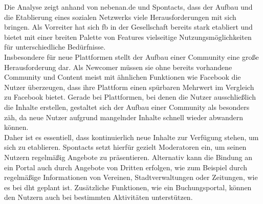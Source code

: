 Die Analyse zeigt anhand von nebenan.de und Spontacts, dass der Aufbau und die Etablierung eines sozialen Netzwerks viele Herausforderungen mit sich bringen. Als Vorreiter hat sich \acrshort{fb} in der Gesellschaft bereits stark etabliert und bietet mit einer breiten Palette von Features vielseitige Nutzungsmöglichkeiten für unterschiedliche Bedürfnisse. \\
Insbesondere für neue Plattformen stellt der Aufbau einer Community eine große Herausforderung dar. Als Newcomer müssen sie ohne bereits vorhandene Community und Content meist mit ähnlichen Funktionen wie Facebook die Nutzer überzeugen, dass ihre Plattform einen spürbaren Mehrwert im Vergleich zu Facebook bietet.
Gerade bei Plattformen, bei denen die Nutzer ausschließlich die Inhalte erstellen, gestaltet sich der Aufbau einer Community als besonders zäh, da neue Nutzer aufgrund mangelnder Inhalte schnell wieder abwandern können.\\
Daher ist es essentiell, dass kontinuierlich neue Inhalte zur Verfügung stehen, um sich zu etablieren. Spontacts setzt hierfür gezielt Moderatoren ein, um seinen Nutzern regelmäßig Angebote zu präsentieren. Alternativ kann die Bindung an ein Portal auch durch Angebote von Dritten erfolgen, wie zum Beispiel durch regelmäßige Informationen von Vereinen, Stadtverwaltungen oder Zeitungen, wie es bei \acrshort{dht} geplant ist. Zusätzliche Funktionen, wie ein Buchungsportal, können den Nutzern auch bei bestimmten Aktivitäten unterstützen.